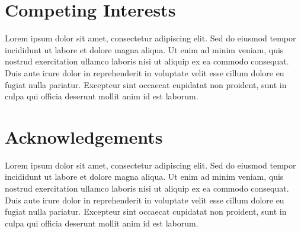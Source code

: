 \documentclass[11pt]{article}
\begin{document}
\section*{Competing Interests}
Lorem ipsum dolor sit amet, consectetur adipiscing elit. Sed do eiusmod tempor incididunt ut labore et dolore magna aliqua. Ut enim ad minim veniam, quis nostrud exercitation ullamco laboris nisi ut aliquip ex ea commodo consequat. Duis aute irure dolor in reprehenderit in voluptate velit esse cillum dolore eu fugiat nulla pariatur. Excepteur sint occaecat cupidatat non proident, sunt in culpa qui officia deserunt mollit anim id est laborum.

\section*{Acknowledgements}
Lorem ipsum dolor sit amet, consectetur adipiscing elit. Sed do eiusmod tempor incididunt ut labore et dolore magna aliqua. Ut enim ad minim veniam, quis nostrud exercitation ullamco laboris nisi ut aliquip ex ea commodo consequat. Duis aute irure dolor in reprehenderit in voluptate velit esse cillum dolore eu fugiat nulla pariatur. Excepteur sint occaecat cupidatat non proident, sunt in culpa qui officia deserunt mollit anim id est laborum.
\end{document}
